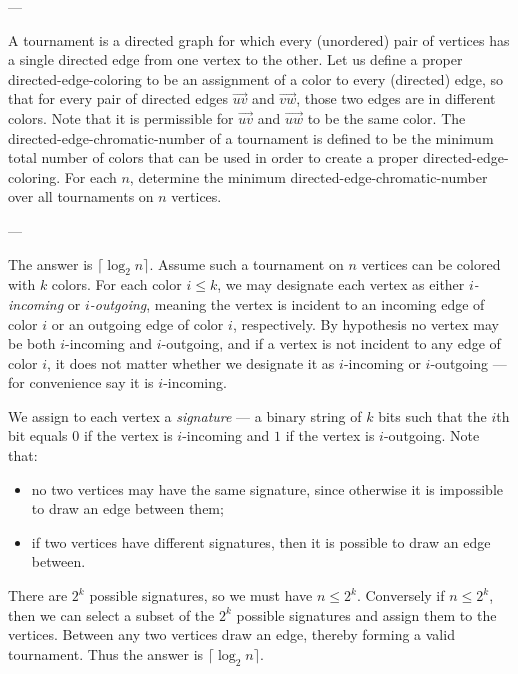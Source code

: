 
---

A tournament is a directed graph for which every (unordered) pair of vertices has a single directed edge from one vertex to the other. Let us define a proper directed-edge-coloring to be an assignment of a color to every (directed) edge, so that for every pair of directed edges $\overrightarrow{uv}$ and $\overrightarrow{vw}$, those two edges are in different colors. Note that it is permissible for $\overrightarrow{uv}$ and $\overrightarrow{uw}$ to be the same color. The directed-edge-chromatic-number of a tournament is defined to be the minimum total number of colors that can be used in order to create a proper directed-edge-coloring. For each $n$, determine the minimum directed-edge-chromatic-number over all tournaments on $n$ vertices.

---

The answer is $\lceil\log_2 n\rceil$. Assume such a tournament on $n$ vertices can be colored with $k$ colors. For each color $i\le k$, we may designate each vertex as either \emph{$i$-incoming} or \emph{$i$-outgoing}, meaning the vertex is incident to an incoming edge of color $i$ or an outgoing edge of color $i$, respectively. By hypothesis no vertex may be both $i$-incoming and $i$-outgoing, and if a vertex is not incident to any edge of color $i$, it does not matter whether we designate it as $i$-incoming or $i$-outgoing --- for convenience say it is $i$-incoming.

We assign to each vertex a \emph{signature} --- a binary string of $k$ bits such that the $i$th bit equals $0$ if the vertex is $i$-incoming and $1$ if the vertex is $i$-outgoing. Note that:
\begin{itemize}
    \item no two vertices may have the same signature, since otherwise it is impossible to draw an edge between them;
    \item if two vertices have different signatures, then it is possible to draw an edge between.
\end{itemize}
There are $2^k$ possible signatures, so we must have $n\le2^k$. Conversely if $n\le2^k$, then we can select a subset of the $2^k$ possible signatures and assign them to the vertices. Between any two vertices draw an edge, thereby forming a valid tournament. Thus the answer is $\lceil\log_2 n\rceil$.

